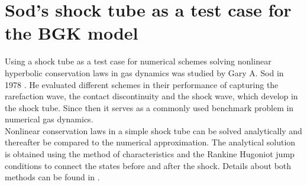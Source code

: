\section{Sod's shock tube as a test case for the BGK model} \label{Sec:FeaturesSOD}
Using a shock tube as a test case for numerical schemes solving nonlinear hyperbolic conservation laws in gas dynamics was studied by Gary A. Sod in 1978 \cite{Sod}. He evaluated different schemes in their performance of capturing the rarefaction wave, the contact discontinuity and the shock wave, which develop in the shock tube. Since then it serves as a commonly used benchmark problem in numerical gas dynamics.\\
Nonlinear conservation laws in a simple shock tube can be solved analytically and thereafter be compared to the numerical approximation. The analytical solution is obtained using the method of characteristics and the Rankine Hugoniot jump conditions to connect the states before and after the shock. Details about both methods can be found in \cite{CFD1}.\\

